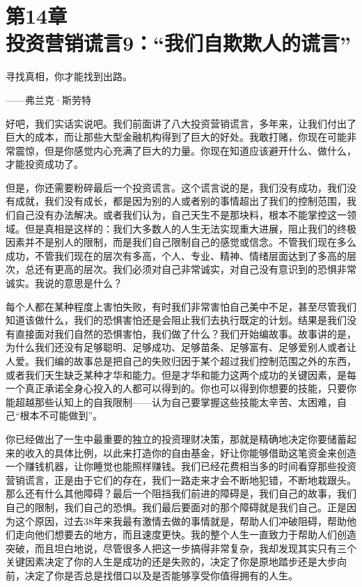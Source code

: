 
\section[第14章\q 投资营销谎言9：“我们自欺欺人的谎言”]{第14章\\ 投资营销谎言9：“我们自欺欺人的谎言”}

\begin{BookQuote}
寻找真相，你才能找到出路。

\hfill ——弗兰克·斯劳特
\end{BookQuote}

好吧，我们实话实说吧。我们前面讲了八大投资营销谎言，多年来，让我们付出了巨大的成本，而让那些大型金融机构得到了巨大的好处。我敢打赌，你现在可能非常震惊，但是你感觉内心充满了巨大的力量。你现在知道应该避开什么、做什么，才能投资成功了。

但是，你还需要粉碎最后一个投资谎言。这个谎言说的是，我们没有成功，我们没有成就，我们没有成长，都是因为别的人或者别的事情超出了我们的控制范围，我们自己没有办法解决。或者我们认为，自己天生不是那块料，根本不能掌控这一领域。但是真相是这样的：我们大多数人的人生无法实现重大进展，阻止我们的终极因素并不是别人的限制，而是我们自己限制自己的感觉或信念。不管我们现在多么成功，不管我们现在的层次有多高，个人、专业、精神、情绪层面达到了多高的层次，总还有更高的层次。我们必须对自己非常诚实，对自己没有意识到的恐惧非常诚实。我说的意思是什么？

每个人都在某种程度上害怕失败，有时我们非常害怕自己美中不足，甚至尽管我们知道该做什么，我们的恐惧害怕还是会阻止我们去执行既定的计划。结果是我们没有直接面对我们自然的恐惧害怕，我们做了什么？我们开始编故事。故事讲的是，为什么我们还没有足够聪明、足够成功、足够苗条、足够富有、足够爱别人或者让人爱。我们编的故事总是把自己的失败归因于某个超过我们控制范围之外的东西，或者我们天生缺乏某种才华和能力。但是才华和能力这两个成功的关键因素，是每一个真正承诺全身心投入的人都可以得到的。你也可以得到你想要的技能，只要你能超越那些认知上的自我限制——认为自己要掌握这些技能太辛苦、太困难，自己“根本不可能做到”。

你已经做出了一生中最重要的独立的投资理财决策，那就是精确地决定你要储蓄起来的收入的具体比例，以此来打造你的自由基金，好让你能够借助这笔资金来创造一个赚钱机器，让你睡觉也能照样赚钱。我们已经花费相当多的时间看穿那些投资营销谎言，正是由于它们的存在，我们一路走来才会不断地犯错，不断地栽跟头。那么还有什么其他障碍？最后一个阻挡我们前进的障碍是，我们自己的故事，我们自己的限制，我们自己的恐惧。我们最后要面对的那个障碍就是我们自己。正是因为这个原因，过去38年来我最有激情去做的事情就是，帮助人们冲破阻碍，帮助他们走向他们想要去的地方，而且速度更快。我的整个人生一直致力于帮助人们创造突破，而且坦白地说，尽管很多人把这一步搞得非常复杂，我却发现其实只有三个关键因素决定了你的人生是成功的还是失败的，决定了你是原地踏步还是大步向前，决定了你是否总是找借口以及是否能够享受你值得拥有的人生。

